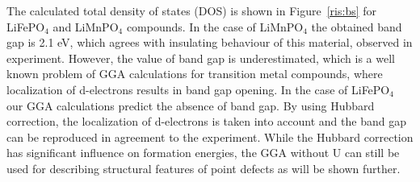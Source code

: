 \begin{table}[h]
\end{table}

The calculated total density of states (DOS) is shown in Figure~\ref{ris:bs} for LiFePO$_4$ and LiMnPO$_4$ compounds. 
In the case of LiMnPO$_4$ the obtained band gap is 2.1 eV, which agrees with insulating behaviour of this material, observed in experiment. However, the value of band gap is underestimated, which is a well known problem of GGA calculations for transition metal compounds, where localization of d-electrons results in band gap opening. 
In the case of LiFePO$_4$ our GGA calculations predict the absence of band gap. 
By using Hubbard correction, the localization of d-electrons is taken into account and the band gap can be reproduced in agreement to the experiment. While the Hubbard correction has significant influence on formation energies, the GGA without U can still be used for describing structural features of point defects as will be shown further.

